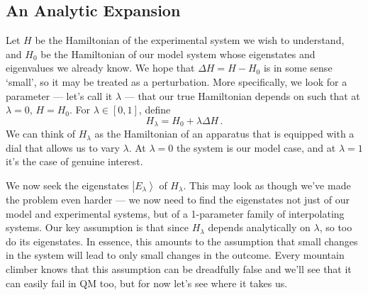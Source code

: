 \documentclass{article}
\theoremstyle{plain}\theoremheaderfont{\normalfont\itshape}\theorembodyfont{\rmfamily}\theoremseparator{.}\newtheorem*{rem}{Remark}\newtheorem*{ex}{Example}\newtheorem*{proof}{Proof}\newtheorem*{altp}{Alternative proof}
\theoremstyle{plain}\theoremheaderfont{\normalfont\bfseries}\theorembodyfont{\rmfamily}\theoremseparator{.}\newtheorem{thm}{Theorem}[section]\newtheorem{lem}[thm]{Lemma}\newtheorem{prop}[thm]{Proposition}\newtheorem*{cor}{Corollary}\newtheorem{defn}[thm]{Definition}\newtheorem{clm}[thm]{Claim}\newtheorem{clminproof}{Claim}
\theoremstyle{break}\theoremheaderfont{\normalfont\itshape}\theorembodyfont{\rmfamily}\theoremseparator{.\medskip}\newtheorem*{proofskip}{Proof}\newtheorem*{exs}{Examples}\newtheorem*{rems}{Remarks}
\theoremstyle{break}\theoremheaderfont{\normalfont\bfseries}\theorembodyfont{\rmfamily}\theoremseparator{.\medskip}\newtheorem{lemskip}[thm]{Lemma}\newtheorem{defnskip}[thm]{Definition}\newtheorem{propskip}[thm]{Proposition}\newtheorem{thmskip}[thm]{Theorem}
\numberwithin{equation}{section}
\newcommand{\ket}[1]{\left| #1 \right\rangle}
\begin{document}
    \subsection{An Analytic Expansion}
    Let \(H\) be the Hamiltonian of the experimental system we wish to understand, and \(H_0\) be the Hamiltonian of our model system whose eigenstates and eigenvalues we already know. We hope that \(\Delta H=H-H_0\) is in some sense `small', so it may be treated as a perturbation. More specifically, we look for a parameter --- let's call it \(\lambda\) --- that our true Hamiltonian depends on such that at \(\lambda=0\), \(H=H_0\). For \(\lambda\in[0,1]\), define
    \begin{equation}
        H_\lambda=H_0+\lambda\Delta H\,.
    \end{equation}
    We can think of \(H_\lambda\) as the Hamiltonian of an apparatus that is equipped with a dial that allows us to vary \(\lambda\). At \(\lambda=0\) the system is our model case, and at \(\lambda=1\) it's the case of genuine interest.

    We now seek the eigenstates \(\ket{E_\lambda}\) of \(H_\lambda\). This may look as though we've made the problem even harder --- we now need to find the eigenstates not just of our model and experimental systems, but of a 1-parameter family of interpolating systems. Our key assumption is that since \(H_\lambda\) depends analytically on \(\lambda\), so too do its eigenstates. In essence, this amounts to the assumption that small changes in the system will lead to only small changes in the outcome. Every mountain climber knows that this assumption can be dreadfully false and we'll see that it can easily fail in QM too, but for now let's see where it takes us.
\end{document}
